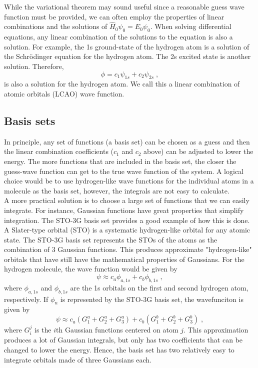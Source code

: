 \documentclass[12pt]{report}
\begin{document}
While the variational theorem may sound useful since a reasonable guess
wave function must be provided, we can often employ the properties of linear
combinations and the solutions of $\hat H_0\psi_0=E_0\psi_0$. When solving
differential equations, any linear combination of the solutions to the
equation is also a solution. For example, the 1s ground-state of the hydrogen
atom is a solution of the Schr\"{o}dinger equation for the hydrogen atom. The
2s excited state is another solution. Therefore,
\begin{equation}
 \phi = c_1\psi_{1s}+c_2\psi_{2s} \; ,
\end{equation}
is also a solution for the hydrogen atom. We call this a linear combination of
atomic orbitals (LCAO) wave function.

\subsection{Basis sets}

In principle, any set of functions (a basis set) can be chosen as a guess and
then the linear combination coefficients ($c_1$ and $c_2$ above) can be
adjusted to lower the energy. The more functions that are included in the
basis set, the closer the guess-wave function can get to the true wave
function of the system. A logical choice would be to use hydrogen-like wave
functions for the individual atoms in a molecule as the basis set, however,
the integrals are not easy to calculate. \\

A more practical solution is to choose a large set of functions that we can
easily integrate. For instance, Gaussian functions have great properties that
simplify integration. The STO-3G basis set provides a good example of how this
is done. A Slater-type orbital (STO) is a systematic hydrogen-like orbital for
any atomic state. The STO-3G basis set represents the STOs of the atoms as the
combination of 3 Gaussian functions. This produces approximate "hydrogen-like"
orbitals that have still have the mathematical properties of Gaussians. For
the hydrogen molecule, the wave function would be given by
\begin{equation}
 \psi \approx c_a\phi_{a,1s}+c_b\phi_{b,1s} \; ,
\end{equation}
where $\phi_{a,1s}$ and $\phi_{b,1s}$ are the 1s orbitals on the first and
second hydrogen atom, respectively. If $\phi_n$ is represented by the STO-3G
basis set, the wavefunciton is given by
\begin{equation}
 \psi \approx c_a(G^a_1+G^a_2+G^a_3)+c_b(G^b_1+G^b_2+G^b_3) \; ,
\end{equation}
where $G^j_i$ is the $i$th Gaussian functions centered on atom $j$. This
approximation produces a lot of Gaussian integrals, but only has two
coefficients that can be changed to lower the energy. Hence, the basis set has
two relatively easy to integrate orbitals made of three Gaussians each. \\
\end{document}
